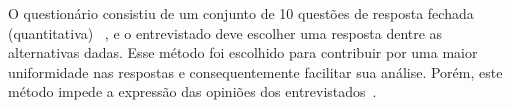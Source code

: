 O questionário consistiu de um conjunto de 10 questões de resposta fechada (quantitativa) ~\cite{elicquest05}, e o entrevistado deve escolher uma resposta dentre as alternativas dadas. Esse método foi escolhido para contribuir por uma maior uniformidade nas respostas e consequentemente facilitar sua análise. Porém, este método impede a expressão das opiniões dos entrevistados~\cite{elicquest05}. 



